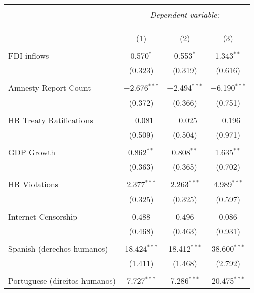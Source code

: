 
\begin{table}[!htbp] \centering 
  \caption{} 
  \label{} 
\begin{tabular}{@{\extracolsep{5pt}}lccc} 
\\[-1.8ex]\hline 
\hline \\[-1.8ex] 
 & \multicolumn{3}{c}{\textit{Dependent variable:}} \\ 
\cline{2-4} 
\\[-1.8ex] & \multicolumn{3}{c}{ } \\ 
\\[-1.8ex] & (1) & (2) & (3)\\ 
\hline \\[-1.8ex] 
 FDI inflows & 0.570$^{*}$ & 0.553$^{*}$ & 1.343$^{**}$ \\ 
  & (0.323) & (0.319) & (0.616) \\ 
  & & & \\ 
 Amnesty Report Count & $-$2.676$^{***}$ & $-$2.494$^{***}$ & $-$6.190$^{***}$ \\ 
  & (0.372) & (0.366) & (0.751) \\ 
  & & & \\ 
 HR Treaty Ratifications & $-$0.081 & $-$0.025 & $-$0.196 \\ 
  & (0.509) & (0.504) & (0.971) \\ 
  & & & \\ 
 GDP Growth & 0.862$^{**}$ & 0.808$^{**}$ & 1.635$^{**}$ \\ 
  & (0.363) & (0.365) & (0.702) \\ 
  & & & \\ 
 HR Violations & 2.377$^{***}$ & 2.263$^{***}$ & 4.989$^{***}$ \\ 
  & (0.325) & (0.325) & (0.597) \\ 
  & & & \\ 
 Internet Censorship & 0.488 & 0.496 & 0.086 \\ 
  & (0.468) & (0.463) & (0.931) \\ 
  & & & \\ 
 Spanish (derechos humanos) & 18.424$^{***}$ & 18.412$^{***}$ & 38.600$^{***}$ \\ 
  & (1.411) & (1.468) & (2.792) \\ 
  & & & \\ 
 Portuguese (direitos humanos) & 7.727$^{***}$ & 7.286$^{***}$ & 20.475$^{***}$ \\ 

\end{tabular}
\end{table}
